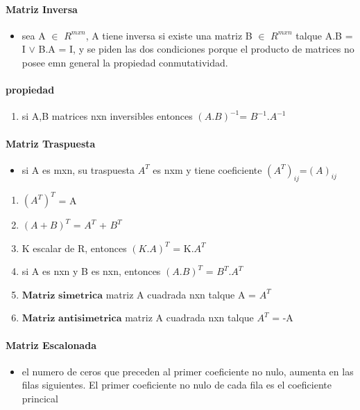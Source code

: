 \documentclass[a4paper]{article}
\begin{document}
\paragraph{Matriz Inversa}
\begin{itemize}
	\item sea A $\in$ $R^{mxn}$, A tiene inversa si existe una matriz B $\in$ $R^{mxn}$ talque A.B = I $\vee$ B.A = I, y se piden las dos condiciones porque el producto de matrices no posee emn general la propiedad conmutatividad.	
\end{itemize}

\paragraph{propiedad}
\begin{enumerate}
	\item si A,B matrices nxn inversibles entonces $(A.B)^{-1}$= $B^{-1}$.$A^{-1}$
\end{enumerate}

\paragraph{Matriz Traspuesta}
\begin{itemize}
	\item si A es mxn, su traspuesta $A^T$ es nxm y tiene coeficiente $(A^T)_{ij}$=$(A)_{ij}$
\end{itemize}

\begin{enumerate}
	\item $(A^T)^T$ = A
	\item $(A + B)^T$ = $A^T$ + $B^T$
	\item K escalar de R, entonces $(K.A)^T$ = K.$A^T$
	\item si A es nxn y B es nxn, entonces $(A.B)^T$ = $B^T$.$A^T$
	
	
	\item $\textbf{Matriz simetrica}$ matriz A cuadrada nxn talque A = $A^T$
	\item $\textbf{Matriz antisimetrica}$ matriz A cuadrada nxn talque $A^T$ = -A
\end{enumerate}

\paragraph{Matriz Escalonada}
\begin{itemize}
	\item el numero de ceros que preceden al primer coeficiente no nulo, aumenta en las filas siguientes. El primer coeficiente no nulo de cada fila es el coeficiente princical
\end{itemize}
		
\end{document}
